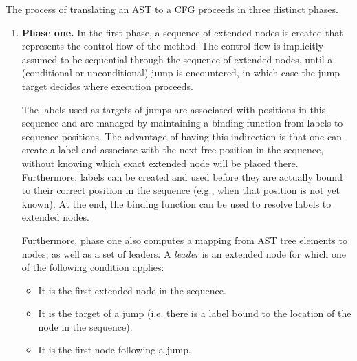 The process of translating an AST to a CFG proceeds in three distinct phases.
\begin{enumerate}
    \item \textbf{Phase one.} In the first phase, a sequence of extended nodes is created
    that represents the control flow of the method. The control flow is implicitly
    assumed to be sequential through the sequence of extended nodes, until a (conditional
    or unconditional) jump is encountered, in which case the jump target decides
    where execution proceeds.
    
    The labels used as targets of jumps are associated with positions in this sequence and are managed
    by maintaining a binding function from labels to sequence positions. The advantage of
    having this indirection is that one can create a label and associate with the next free
    position in the sequence, without knowing which exact extended node will be placed there.
    Furthermore, labels can be created and used before they are actually bound to their correct
    position in the sequence (e.g., when that position is not yet known).
    At the end, the binding function can be used to resolve labels to
    extended nodes.
    
    Furthermore, phase one also computes a mapping from AST tree elements to nodes, as well
    as a set of leaders. A \emph{leader} is an extended node for which one of the following
    condition applies:
    \begin{itemize}
    \item It is the first extended node in the sequence.
    \item It is the target of a jump (i.e. there is a label bound to the location of the node
    in the sequence).
    \item It is the first node following a jump.
    \end{itemize}
    

\end{enumerate}
